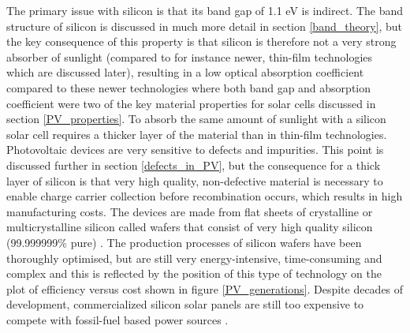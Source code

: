 The primary issue with silicon is that its band gap of 1.1 eV is indirect. The band structure of silicon is discussed in much more detail in section \ref{band_theory}, but the key consequence of this property is that silicon is therefore not a very strong absorber of sunlight (compared to for instance newer, thin-film technologies which are discussed later), resulting in a low optical absorption coefficient  compared to these newer technologies where both band gap and absorption coefficient were two of the key material properties for solar cells discussed in section \ref{PV_properties}. To absorb the same amount of sunlight with a silicon solar cell requires a thicker layer of the material than in thin-film technologies. Photovoltaic devices are very sensitive to defects and impurities. This point is discussed further in section \ref{defects_in_PV}, but the consequence for a thick layer of silicon is that very high quality, non-defective material is necessary to enable charge carrier collection before recombination occurs, which results in high manufacturing costs. The devices are made from flat sheets of crystalline or multicrystalline silicon called wafers that consist of very high quality silicon (99.999999\% pure) 
\cite{sus_book_5}.
The production processes of silicon wafers have been thoroughly optimised, but are still very energy-intensive, time-consuming and complex \cite{emerging_pv} and this is reflected by the position of this type of technology on the plot of efficiency versus cost shown in figure \ref{PV_generations}. Despite decades of development, commercialized silicon solar panels are still too expensive to compete with fossil-fuel based power sources \cite{FE_PV_rev1_5}. \\

